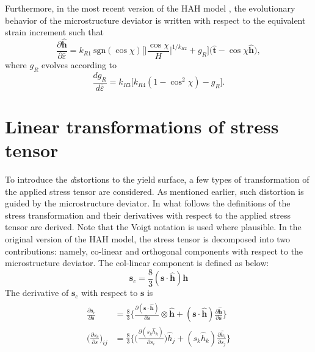 \documentclass[12pt]{amsart}
\begin{document}
Furthermore, in the most recent version of the HAH model \cite{barlat2014}, the evolutionary behavior of the microstructure deviator is written with respect to the equivalent strain increment such that
\begin{equation}
  \label{eq:dmicro1}
  \frac{\partial\hat{\mathbf{h}}}{\partial \bar{\varepsilon}} = k_{R1}\ \text{sgn}(\cos\chi)\big[\big|\frac{\cos\chi}{H}\big|^{1/k_{R2}} +g_R \big] \big(\hat{\mathbf{t}}-\cos\chi \hat{\mathbf{h}}\big),
\end{equation}
where $g_R$ evolves according to
\begin{equation}
  \label{eq:dmicro2}
\frac{dg_R}{d\bar{\varepsilon}} = k_{R3} \big[k_{R4} (1-\cos^2\chi) -g_R \big].
\end{equation}
\newline
\section{Linear transformations of stress tensor}
\label{sec:stress_deriv}
To introduce the {\emph distortions} to the yield surface, a few types of transformation of the applied stress tensor are considered.
As mentioned earlier, such distortion is guided by the microstructure deviator.
In what follows the definitions of the stress transformation and their derivatives with respect to the applied stress tensor are derived.
Note that the Voigt notation is used where plausible.
\newline
In the original version of the HAH model, the stress tensor is decomposed into two contributions: namely, co-linear and orthogonal components with respect to the microstructure deviator.
The col-linear component is defined as below:
\begin{equation}
  \label{eq:decomp1}
  \mathbf{s}_c = \frac{8}{3} (\mathbf{s}\cdot\hat{\mathbf{h}}) \mathbf{h}
\end{equation}
The derivative of $\mathbf{s}_c$ with respect to $\mathbf{s}$ is
\begin{eqnarray}
  \begin{split}
  \label{eq:decomp2}
  \frac{\partial\mathbf{s}_c}{\partial\mathbf{s}} &= \frac{8}{3}\bigg\{  \frac{\partial(\mathbf{s}\cdot\hat{\mathbf{h}})}{\partial\mathbf{s}} \otimes \hat{\mathbf{h}}+ (\mathbf{s}\cdot\hat{\mathbf{h}}) \frac{\partial\hat{\mathbf{h}}}{\partial\mathbf{s}}\bigg\}\\
  \bigg( \frac{\partial s_c}{\partial s}\bigg)_{ij}&= \frac{8}{3}\Bigg\{ \bigg(\frac{\partial(s_{k}\hat{h}_{k})}{\partial s_i}\bigg)\hat{h}_j +(s_k\hat{h}_k)\frac{\partial\hat{h}_i}{\partial s_j} \Bigg\}
  \end{split}
\end{eqnarray}
\end{document}
